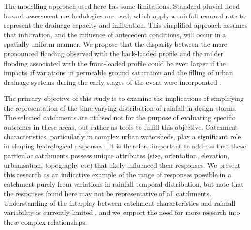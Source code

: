 \documentclass[APA,Times2COL]{WileyNJDv5}
\begin{document}
The modelling approach used here has some limitations. Standard pluvial flood hazard assessment methodologies are used, which apply a rainfall removal rate to represent the drainage capacity and infiltration. This simplified approach assumes that infiltration, and the influence of antecedent conditions, will occur in a spatially uniform manner. We propose that the disparity between the more pronounced flooding observed with the back-loaded profile and the milder flooding associated with the front-loaded profile could be even larger if the impacts of variations in permeable ground saturation and the filling of urban drainage systems during the early stages of the event were incorporated \citep{houston2011pluvial}.

The primary objective of this study is to examine the implications of simplifying the representation of the time-varying distribution of rainfall in design storms. The selected catchments are utilised not for the purpose of evaluating specific outcomes in these areas, but rather as tools to fulfill this objective. Catchment characteristics, particularly in complex urban watersheds, play a significant role in shaping hydrological responses \citep{singh1997effect, szelkag2022flood, ten2017role}. It is therefore important to address that these particular catchments possess unique attributes (size, orientation, elevation, urbanisation, topography etc) that likely influenced their responses. We present this research as an indicative example of the range of responses possible in a catchment purely from variations in rainfall temporal distribution, but note that the responses found here may not be representative of all catchments. Understanding of the interplay between catchment characteristics and rainfall variability is currently limited \citep{ten2017role}, and we support the need for more research into these complex relationships.
\end{document}
